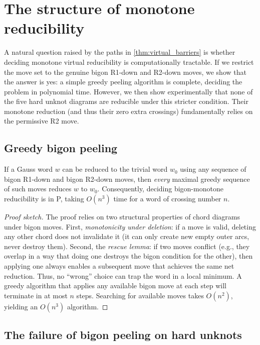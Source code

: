 \documentclass[a4paper,UKenglish,cleveref,autoref]{lipics-v2021}
\begin{document}
\section{The structure of monotone reducibility}\label{sec:bigon}

A natural question raised by the paths in \cref{thm:virtual_barriers} is whether deciding monotone virtual reducibility is computationally tractable.
If we restrict the move set to the genuine bigon R1-down and R2-down moves, we show that the answer is yes: a simple greedy peeling algorithm is complete, deciding the problem in polynomial time.
However, we then show experimentally that none of the five hard unknot diagrams are reducible under this stricter condition.
Their monotone reduction (and thus their zero extra crossings) fundamentally relies on the permissive R2 move.

\subsection{Greedy bigon peeling}

\begin{theorem}\label{thm:greedy}
If a Gauss word $w$ can be reduced to the trivial word $w_0$ using any sequence of bigon R1-down and bigon R2-down moves, then \emph{every} maximal greedy sequence of such moves reduces $w$ to $w_0$.
Consequently, deciding bigon-monotone reducibility is in P, taking $O(n^3)$ time for a word of crossing number $n$.
\end{theorem}

\begin{proof}[Proof sketch]
The proof relies on two structural properties of chord diagrams under bigon moves.
First, \emph{monotonicity under deletion}: if a move is valid, deleting any other chord does not invalidate it (it can only create new empty outer arcs, never destroy them).
Second, the \emph{rescue lemma}: if two moves conflict (e.g., they overlap in a way that doing one destroys the bigon condition for the other), then applying one always enables a subsequent move that achieves the same net reduction.
Thus, no ``wrong'' choice can trap the word in a local minimum.
A greedy algorithm that applies any available bigon move at each step will terminate in at most $n$ steps. Searching for available moves takes $O(n^2)$, yielding an $O(n^3)$ algorithm.
\end{proof}

\subsection{The failure of bigon peeling on hard unknots}
\end{document}

